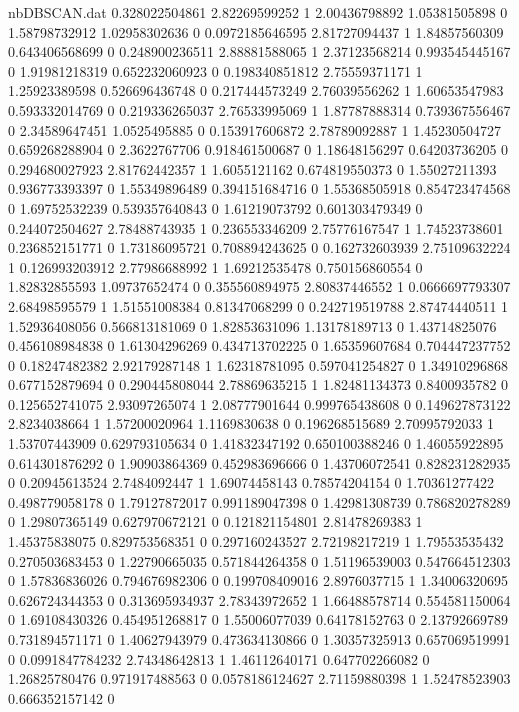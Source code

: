 \begin{filecontents}{nbDBSCAN.dat}
0.328022504861 2.82269599252 1
2.00436798892 1.05381505898 0
1.58798732912 1.02958302636 0
0.0972185646595 2.81727094437 1
1.84857560309 0.643406568699 0
0.248900236511 2.88881588065 1
2.37123568214 0.993545445167 0
1.91981218319 0.652232060923 0
0.198340851812 2.75559371171 1
1.25923389598 0.526696436748 0
0.217444573249 2.76039556262 1
1.60653547983 0.593332014769 0
0.219336265037 2.76533995069 1
1.87787888314 0.739367556467 0
2.34589647451 1.0525495885 0
0.153917606872 2.78789092887 1
1.45230504727 0.659268288904 0
2.3622767706 0.918461500687 0
1.18648156297 0.64203736205 0
0.294680027923 2.81762442357 1
1.6055121162 0.674819550373 0
1.55027211393 0.936773393397 0
1.55349896489 0.394151684716 0
1.55368505918 0.854723474568 0
1.69752532239 0.539357640843 0
1.61219073792 0.601303479349 0
0.244072504627 2.78488743935 1
0.236553346209 2.75776167547 1
1.74523738601 0.236852151771 0
1.73186095721 0.708894243625 0
0.162732603939 2.75109632224 1
0.126993203912 2.77986688992 1
1.69212535478 0.750156860554 0
1.82832855593 1.09737652474 0
0.355560894975 2.80837446552 1
0.0666697793307 2.68498595579 1
1.51551008384 0.81347068299 0
0.242719519788 2.87474440511 1
1.52936408056 0.566813181069 0
1.82853631096 1.13178189713 0
1.43714825076 0.456108984838 0
1.61304296269 0.434713702225 0
1.65359607684 0.704447237752 0
0.18247482382 2.92179287148 1
1.62318781095 0.597041254827 0
1.34910296868 0.677152879694 0
0.290445808044 2.78869635215 1
1.82481134373 0.8400935782 0
0.125652741075 2.93097265074 1
2.08777901644 0.999765438608 0
0.149627873122 2.8234038664 1
1.57200020964 1.1169830638 0
0.196268515689 2.70995792033 1
1.53707443909 0.629793105634 0
1.41832347192 0.650100388246 0
1.46055922895 0.614301876292 0
1.90903864369 0.452983696666 0
1.43706072541 0.828231282935 0
0.20945613524 2.7484092447 1
1.69074458143 0.78574204154 0
1.70361277422 0.498779058178 0
1.79127872017 0.991189047398 0
1.42981308739 0.786820278289 0
1.29807365149 0.627970672121 0
0.121821154801 2.81478269383 1
1.45375838075 0.829753568351 0
0.297160243527 2.72198217219 1
1.79553535432 0.270503683453 0
1.22790665035 0.571844264358 0
1.51196539003 0.547664512303 0
1.57836836026 0.794676982306 0
0.199708409016 2.8976037715 1
1.34006320695 0.626724344353 0
0.313695934937 2.78343972652 1
1.66488578714 0.554581150064 0
1.69108430326 0.454951268817 0
1.55006077039 0.64178152763 0
2.13792669789 0.731894571171 0
1.40627943979 0.473634130866 0
1.30357325913 0.657069519991 0
0.0991847784232 2.74348642813 1
1.46112640171 0.647702266082 0
1.26825780476 0.971917488563 0
0.0578186124627 2.71159880398 1
1.52478523903 0.666352157142 0

\end{filecontents}
